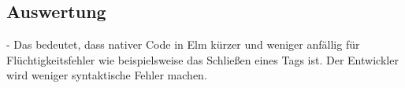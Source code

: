 


\subsection{Auswertung}
\label{sec:Auswertung}
- Das bedeutet, dass nativer Code in Elm kürzer und weniger anfällig für Flüchtigkeitsfehler wie beispielsweise das Schließen eines Tags ist. Der Entwickler wird weniger syntaktische Fehler machen.\\


